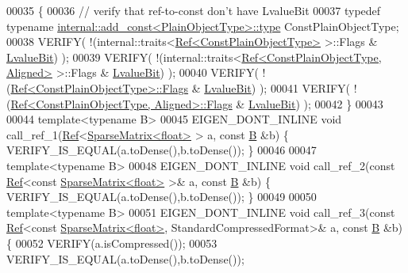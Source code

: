\begin{DoxyCode}
00035 \{
00036   \textcolor{comment}{// verify that ref-to-const don't have LvalueBit}
00037   \textcolor{keyword}{typedef} \textcolor{keyword}{typename} \hyperlink{group___core___module_class_eigen_1_1_transpose}{internal::add\_const<PlainObjectType>::type} 
      ConstPlainObjectType;
00038   VERIFY( !(internal::traits<\hyperlink{group___core___module_class_eigen_1_1_ref}{Ref<ConstPlainObjectType>} >::Flags & 
      \hyperlink{group__flags_gae2c323957f20dfdc6cb8f44428eaec1a}{LvalueBit}) );
00039   VERIFY( !(internal::traits<\hyperlink{group___core___module_class_eigen_1_1_ref}{Ref<ConstPlainObjectType, Aligned>} >::Flags 
      & \hyperlink{group__flags_gae2c323957f20dfdc6cb8f44428eaec1a}{LvalueBit}) );
00040   VERIFY( !(\hyperlink{group___core___module_class_eigen_1_1_ref}{Ref<ConstPlainObjectType>::Flags} & 
      \hyperlink{group__flags_gae2c323957f20dfdc6cb8f44428eaec1a}{LvalueBit}) );
00041   VERIFY( !(\hyperlink{group___core___module_class_eigen_1_1_ref}{Ref<ConstPlainObjectType, Aligned>::Flags} & 
      \hyperlink{group__flags_gae2c323957f20dfdc6cb8f44428eaec1a}{LvalueBit}) );
00042 \}
00043 
00044 \textcolor{keyword}{template}<\textcolor{keyword}{typename} B>
00045 EIGEN\_DONT\_INLINE \textcolor{keywordtype}{void} call\_ref\_1(\hyperlink{group___core___module_class_eigen_1_1_ref}{Ref}<\hyperlink{group___sparse_core___module_class_eigen_1_1_sparse_matrix}{SparseMatrix<float>} > a, \textcolor{keyword}{const} 
      \hyperlink{group___core___module_class_eigen_1_1_matrix}{B} &b) \{ VERIFY\_IS\_EQUAL(a.toDense(),b.toDense()); \}
00046 
00047 \textcolor{keyword}{template}<\textcolor{keyword}{typename} B>
00048 EIGEN\_DONT\_INLINE \textcolor{keywordtype}{void} call\_ref\_2(\textcolor{keyword}{const} \hyperlink{group___core___module_class_eigen_1_1_ref}{Ref}<\textcolor{keyword}{const} \hyperlink{group___sparse_core___module_class_eigen_1_1_sparse_matrix}{SparseMatrix<float>} >& a, \textcolor{keyword}{const} 
      \hyperlink{group___core___module_class_eigen_1_1_matrix}{B} &b) \{ VERIFY\_IS\_EQUAL(a.toDense(),b.toDense()); \}
00049 
00050 \textcolor{keyword}{template}<\textcolor{keyword}{typename} B>
00051 EIGEN\_DONT\_INLINE \textcolor{keywordtype}{void} call\_ref\_3(\textcolor{keyword}{const} \hyperlink{group___core___module_class_eigen_1_1_ref}{Ref}<\textcolor{keyword}{const} \hyperlink{group___sparse_core___module_class_eigen_1_1_sparse_matrix}{SparseMatrix<float>}, 
      StandardCompressedFormat>& a, \textcolor{keyword}{const} \hyperlink{group___core___module_class_eigen_1_1_matrix}{B} &b) \{
00052   VERIFY(a.isCompressed());
00053   VERIFY\_IS\_EQUAL(a.toDense(),b.toDense());

\end{DoxyCode}
